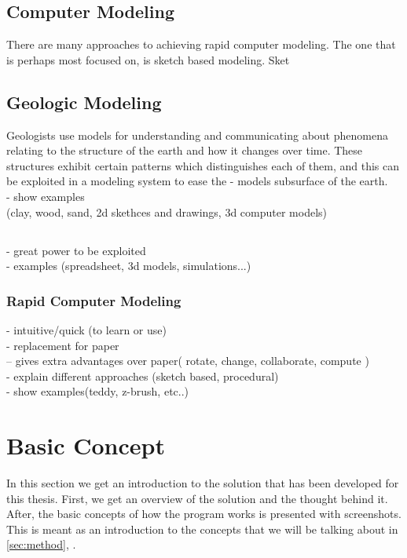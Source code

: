 \documentclass[a4paper,12pt]{report}
\newcommand{\secref}[1]{\autoref{#1}, \nameref{#1}}
\begin{document}
\section{Computer Modeling}
There are many approaches to achieving rapid computer modeling. The one that is perhaps most focused on, is sketch based modeling. Sket

\section{Geologic Modeling}
Geologists use models for understanding and communicating about phenomena relating to the structure of the earth and how it changes over time. These structures exhibit certain patterns which distinguishes each of them, and this can be exploited in a modeling system to ease the 
- models subsurface of the earth.\\
- show examples\\(clay, wood, sand, 2d skethces and drawings, 3d computer models)

\section{}
- great power to be exploited\\
- examples (spreadsheet, 3d models, simulations...)\\
\subsection{Rapid Computer Modeling}
- intuitive/quick (to learn or use)\\
- replacement for paper\\
  -- gives extra advantages over paper( rotate, change, collaborate, compute )\\
- explain different approaches (sketch based, procedural)\\
- show examples(teddy, z-brush, etc..)\\

\clearpage
\chapter{Basic Concept}
In this section we get an introduction to the solution that has been developed for this thesis. First, we get an overview of the solution and the thought behind it. After, the basic concepts of how the program works is presented with screenshots.  This is meant as an introduction to the concepts that we will be talking about in \secref{sec:method}.
\label{sec:concept}
\end{document}
